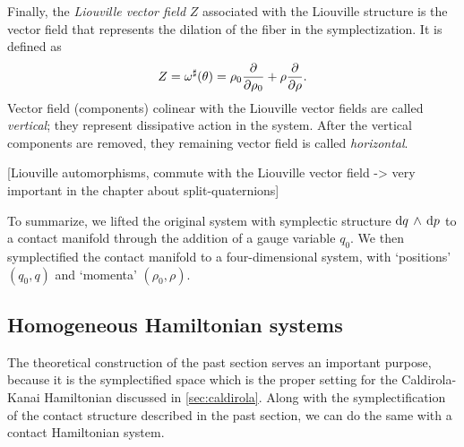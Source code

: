 Finally, the \emph{Liouville vector field} $Z$ associated with the Liouville structure is the vector field that represents the dilation of the fiber in the symplectization. It is defined as
\begin{equation}
    Z = \omega^\sharp(\theta) = \rho_0\pdv{}{\rho_0} + \rho\pdv{}{\rho}. 
    \label{eq:liouville_vf}
\end{equation}
Vector field (components) colinear with the Liouville vector fields are called \emph{vertical}; they represent dissipative action in the system. After the vertical components are removed, they remaining vector field is called \emph{horizontal}.

[Liouville automorphisms, commute with the Liouville vector field -> very important in the chapter about split-quaternions]

To summarize, we lifted the original system with symplectic structure $ \dd{q}\,\wedge\,\dd{p} $ to a contact manifold through the addition of a gauge variable $q_0$. We then symplectified the contact manifold to a four-dimensional system, with `positions' $(q_0, q)$ and `momenta' $(\rho_0, \rho)$.

\subsection{Homogeneous Hamiltonian systems} The theoretical construction of the past section serves an important purpose, because it is the symplectified space which is the proper setting for the Caldirola-Kanai Hamiltonian discussed in \cref{sec:caldirola}. Along with the symplectification of the contact structure described in the past section, we can do the same with a contact Hamiltonian system.

